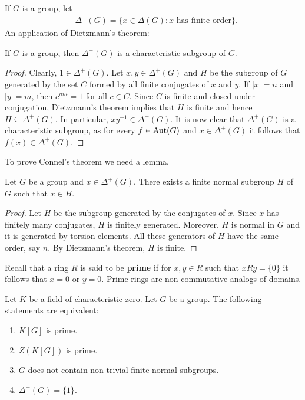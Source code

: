 If $G$ is a group, let 
\begin{align*}
	&\Delta^+(G)=\{x\in \Delta(G):\text{$x$ has finite order}\}.
\end{align*}
An application of Dietzmann's theorem:

\begin{proposition}
	\label{lem:DcharG}
	If $G$ is a group, then $\Delta^+(G)$ is a characteristic subgroup of $G$.
\end{proposition}

\begin{proof}
	Clearly, $1\in\Delta^+(G)$. 
	Let $x,y\in\Delta^+(G)$ and $H$ be the subgroup of $G$ generated by the set 
	$C$ formed by all finite conjugates of $x$ and $y$. If $|x|=n$ and 
	$|y|=m$, then $c^{nm}=1$ for all $c\in C$. 
	Since $C$ is finite and closed under conjugation, Dietzmann's theorem 
	implies that $H$ is finite and hence 
	$H\subseteq\Delta^+(G)$. In particular, $xy^{-1}\in\Delta^+(G)$. It is now clear
	that $\Delta^+(G)$ is a characteristic subgroup, as for 
	every $f\in\operatorname{Aut}(G)$ and $x\in\Delta^+(G)$ it follows that $f(x)\in\Delta^+(G)$. 
\end{proof}

To prove Connel's theorem we need a lemma. 

\begin{lemma}
	\label{lem:Connel}
	Let $G$ be a group and  $x\in\Delta^+(G)$. There exists a finite normal subgroup
	$H$ of $G$ such that $x\in H$.
\end{lemma}

\begin{proof}
	Let $H$ be the subgroup generated by the conjugates of $x$. Since $x$ has finitely many conjugates, 
	$H$ is finitely generated. Moreover, $H$ is normal in $G$ and it is generated by torsion elements. 
	All these generators of $H$ have the same order, say $n$. By Dietzmann's theorem, 
	$H$ is finite. 
\end{proof}

Recall that a ring $R$ is said to be \textbf{prime} 
if for $x,y\in R$ such that $xRy=\{0\}$ it follows that $x=0$ or $y=0$. Prime rings
are non-commutative analogs of domains. 

\begin{theorem}[Connell]
	\label{thm:Connel}
	Let $K$ be a field of characteristic zero. Let 
	$G$ be a group. The following statements are equivalent: 
	\begin{enumerate}
		\item $K[G]$ is prime.
		\item $Z(K[G])$ is prime.
		\item $G$ does not contain non-trivial finite normal subgroups. 
		\item $\Delta^+(G)=\{1\}$.
	\end{enumerate}
\end{theorem}

